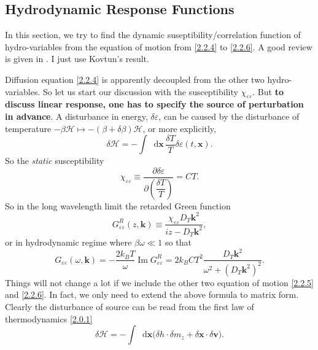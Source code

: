 \documentclass[10pt,nofootinbib,letterpaper]{revtex4}
\newcommand*\dd{\mathop{}\!\mathrm{d}}
\begin{document}
	\subsection{Hydrodynamic Response Functions}
		In this section, we try to find the dynamic suseptibility/correlation function of hydro-variables from the equation of motion from \eqref{2.2.4} to \eqref{2.2.6}. A good review is given in \cite{kovtun2012lectures}. I just use Kovtun's result.\par
		Diffusion equation \eqref{2.2.4} is apparently decoupled from the other two hydro-variables. So let us start our discussion with the susceptibility $\chi_{\varepsilon \varepsilon}$. But \textbf{to discuss linear response, one has to specify the source of perturbation in advance}. A disturbance in energy, $\delta \varepsilon$, can be caused by the disturbance of temperature $-\beta\mathcal{H}\mapsto-(\beta+\delta\beta)\mathcal{H}$, or more explicitly,
		\begin{equation}\label{2.3.1}
			\delta\mathcal{H}=-\int\dd\bm{x}\,\dfrac{\delta T}{T}\delta\varepsilon(t,\bm{x}).
		\end{equation}
		So the \emph{static} susceptibility
		\begin{equation}\label{2.3.2}
			\chi_{\varepsilon \varepsilon}\equiv\dfrac{\partial\delta\varepsilon}{\partial\left(\dfrac{\delta T}{T}\right)}=CT.
		\end{equation}
		So in the long wavelength limit the retarded Green function \cite{kovtun2012lectures,chaikin2000principles}
		\begin{equation}\label{2.3.3}
			G_{\varepsilon\varepsilon}^R(z,\bm{k})\equiv\dfrac{\chi_{\varepsilon \varepsilon}D_T\bm{k}^2}{iz-D_T\bm{k}^2},
		\end{equation}
		or in hydrodynamic regime where $\beta\omega\ll1$ so that
		\begin{equation}\label{2.3.4}
			G_{\varepsilon \varepsilon}(\omega,\bm{k})=-\dfrac{2k_BT}{\omega}\mathop{\mathrm{Im}}G^R_{\varepsilon \varepsilon}=2k_BCT^2\dfrac{D_T\bm{k}^2}{\omega^2+(D_T\bm{k}^2)^2}.
		\end{equation}
		\indent Things will not change a lot if we include the other two equation of motion \eqref{2.2.5} and \eqref{2.2.6}. In fact, we only need to extend the above formula to matrix form. Clearly the disturbance of source can be read from the first law of thermodynamics \eqref{2.0.1}
		\begin{equation}\label{2.3.5}
			\delta\mathcal{H}=-\int\dd\bm{x}\bigg(\delta h\cdot\delta m_z+\delta\bm{x}\cdot\delta\bm{v}\bigg).
		\end{equation}
\end{document}
